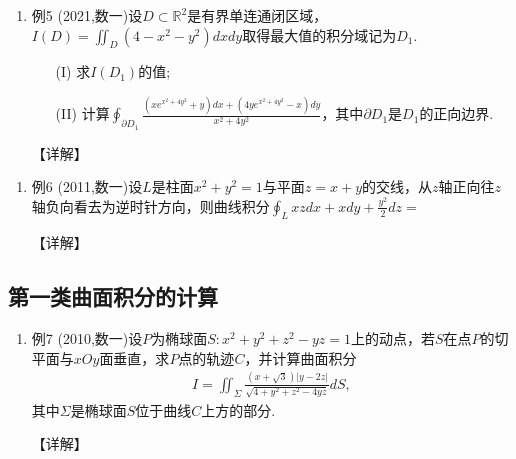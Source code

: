 \documentclass[12pt, a4paper, oneside, UTF8]{ctexbook}
\begin{document}
\begin{remark}
\end{remark}

\begin{enumerate}[label=\arabic*.,start=5]
    \item 例5 (2021,数一)设$D\subset \mathbb{R}^2$是有界单连通闭区域，$I(D)=\iint_D(4-x^2-y^2)dxdy$取得最大值的积分域记为$D_1$.
    \begin{enumerate}
        \item[(I)] 求$I(D_1)$的值;
        \item[(II)] 计算$\oint_{\partial D_1}\frac{(xe^{x^2+4y^2}+y)dx+(4ye^{x^2+4y^2}-x)dy}{x^2+4y^2}$，其中$\partial D_1$是$D_1$的正向边界.
    \end{enumerate}
    
    \begin{solution}
    【详解】
    \end{solution}
\end{enumerate}

\begin{remark}
\end{remark}

\begin{enumerate}[label=\arabic*.,start=6]
    \item 例6 (2011,数一)设$L$是柱面$x^2+y^2=1$与平面$z=x+y$的交线，从$z$轴正向往$z$轴负向看去为逆时针方向，则曲线积分$\oint_L xz dx+xdy+\frac{y^2}{2}dz=$
    
    \begin{solution}
    【详解】
    \end{solution}
\end{enumerate}

\subsection{第一类曲面积分的计算}

\begin{remark}[方法]
\end{remark}

\begin{enumerate}[label=\arabic*.,start=7]
    \item 例7 (2010,数一)设$P$为椭球面$S:x^2+y^2+z^2-yz=1$上的动点，若$S$在点$P$的切平面与$xOy$面垂直，求$P$点的轨迹$C$，并计算曲面积分
    \begin{align*}
    I=\iint_{\Sigma}\frac{(x+\sqrt{3})|y-2z|}{\sqrt{4+y^2+z^2-4yz}}dS,
    \end{align*}
    其中$\Sigma$是椭球面$S$位于曲线$C$上方的部分.
    
    \begin{solution}
    【详解】
    \end{solution}
\end{enumerate}
\end{document}
